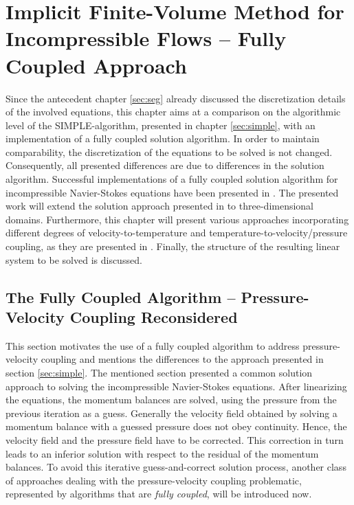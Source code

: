 \chapter{Implicit Finite-Volume Method for Incompressible Flows -- Fully Coupled Approach}
\label{sec:cpld}

Since the antecedent chapter \ref{sec:seg} already discussed the discretization details of the involved equations, this chapter aims at a comparison on the algorithmic level of the SIMPLE-algorithm, presented in chapter \ref{sec:simple}, with an implementation of a fully coupled solution algorithm. In order to maintain comparability, the discretization of the equations to be solved is not changed. Consequently, all presented differences are due to differences in the solution algorithm. Successful implementations of a fully coupled solution algorithm for incompressible Navier-Stokes equations have been presented in \cite{chen10,darwish09,falk13,vakilipour12}. The presented work will extend the solution approach presented in \cite{falk13} to three-dimensional domains. Furthermore, this chapter will present various approaches incorporating different degrees of velocity-to-temperature and temperature-to-velocity/pressure coupling, as they are presented in \cite{vakilipour12}. Finally, the structure of the resulting linear system to be solved is discussed.

\section{The Fully Coupled Algorithm -- Pressure-Velocity Coupling Reconsidered}
\label{sec:reconsider}

This section motivates the use of a fully coupled algorithm to address pressure-velocity coupling and mentions the differences to the approach presented in section \ref{sec:simple}. The mentioned section presented a common solution approach to solving the incompressible Navier-Stokes equations. After linearizing the equations, the momentum balances are solved, using the pressure from the previous iteration as a guess. Generally the velocity field obtained by solving a momentum balance with a guessed pressure does not obey continuity. Hence, the velocity field and the pressure field have to be corrected. This correction in turn leads to an inferior solution with respect to the residual of the momentum balances. To avoid this iterative guess-and-correct solution process, another class of approaches dealing with the pressure-velocity coupling problematic, represented by algorithms that are \emph{fully coupled}, will be introduced now.

